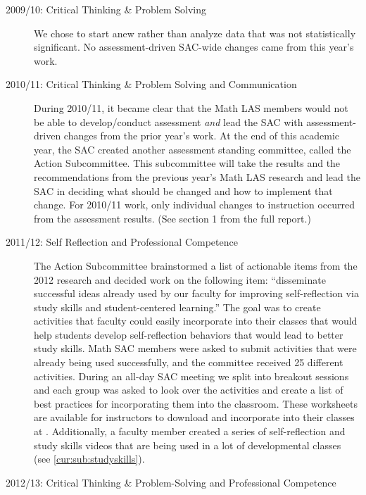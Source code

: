 \begin{description}
\item[2009/10: Critical Thinking \& Problem Solving]

We chose to start anew rather than analyze data that was not statistically significant.  No assessment-driven SAC-wide changes came from this year's work.

\item[2010/11:  Critical Thinking \& Problem Solving and Communication]

During 2010/11, it became clear that the Math LAS members would not be able to develop/conduct assessment \emph{and} lead the SAC with assessment-driven changes from the prior year's work.  At the end of this academic year, the SAC created another assessment standing committee, called the Action Subcommittee.  This subcommittee will take the results and the recommendations from the previous year's Math LAS research and lead the SAC in deciding what should be changed and how to implement that change.  For 2010/11 work, only individual changes to instruction occurred from the assessment results.  (See section 1 from the full report.)

\item[2011/12: Self Reflection and Professional Competence]

The Action Subcommittee brainstormed a list of actionable items from the 2012 research and decided work on the following item: ``disseminate successful ideas already used by our faculty for improving self-reflection via study skills and student-centered learning.''  The goal was to create activities that faculty could easily incorporate into their classes that would help students develop self-reflection behaviors that would lead to better study skills.  Math SAC members were asked to submit activities that were already being used successfully, and the committee received 25 different activities.  During an all-day SAC meeting we split into breakout sessions and each group was asked to look over the activities and create a list of best practices for incorporating them into the classroom. These worksheets are available for instructors to download and incorporate into their classes at \cite{selfcenteredlearning}.  Additionally, a faculty member created a series of self-reflection and study skills videos that are being used in a lot of developmental classes (see \vref{cur:sub:studyskills}).

\item[2012/13:  Critical Thinking \& Problem-Solving and Professional Competence]


\end{description}
